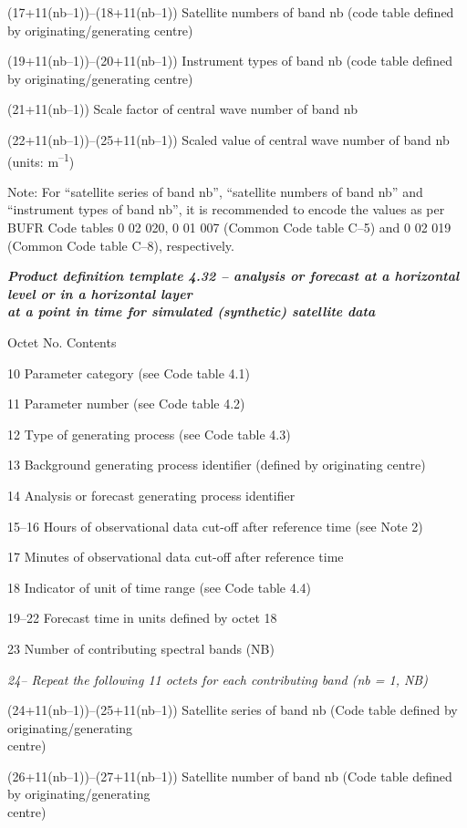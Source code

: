 (17+11(nb--1))--(18+11(nb--1)) Satellite numbers of band nb (code table defined by originating/generating centre)

(19+11(nb--1))--(20+11(nb--1)) Instrument types of band nb (code table defined by originating/generating centre)

(21+11(nb--1)) Scale factor of central wave number of band nb

(22+11(nb--1))--(25+11(nb--1)) Scaled value of central wave number of band nb (units: m\textsuperscript{--1})

Note: For ``satellite series of band nb'', ``satellite numbers of band nb'' and ``instrument types of band nb'', it is recommended to encode the values as per BUFR Code tables 0 02 020, 0 01 007 (Common Code table C--5) and 0 02 019 (Common Code table C--8), respectively.

\emph{\textbf{Product definition template 4.32 -- analysis or forecast at a horizontal level or in a horizontal layer\\
at a point in time for simulated (synthetic) satellite data}}

Octet No. Contents

10 Parameter category (see Code table 4.1)

11 Parameter number (see Code table 4.2)

12 Type of generating process (see Code table 4.3)

13 Background generating process identifier (defined by originating centre)

14 Analysis or forecast generating process identifier

15--16 Hours of observational data cut-off after reference time (see Note 2)

17 Minutes of observational data cut-off after reference time

18 Indicator of unit of time range (see Code table 4.4)

19--22 Forecast time in units defined by octet 18

23 Number of contributing spectral bands (NB)

\emph{24-- Repeat the following 11 octets for each contributing band (nb = 1, NB)}

(24+11(nb--1))--(25+11(nb--1)) Satellite series of band nb (Code table defined by originating/generating\\
centre)

(26+11(nb--1))--(27+11(nb--1)) Satellite number of band nb (Code table defined by originating/generating\\
centre)

